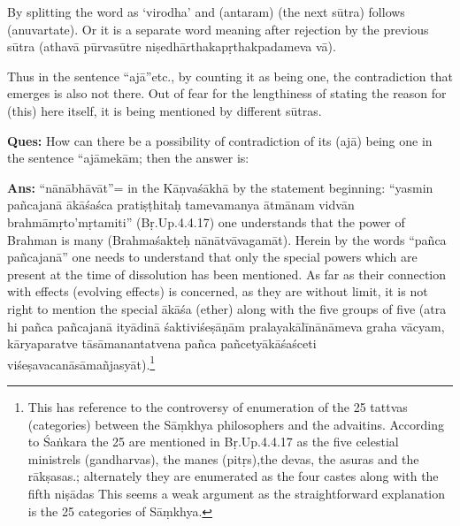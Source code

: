 \textbf{}




By splitting the word as ‘virodha’ and (antaram) (the next sūtra) follows (anuvartate). Or it is a separate word meaning after rejection by the previous sūtra (athavā pūrvasūtre niṣedhārthakapṛthakpadameva vā).

\newpage

Thus in the sentence “ajā”etc., by counting it as being one, the contradiction that emerges is also not there. Out of fear for the lengthiness of stating the reason for (this) here itself, it is being mentioned by different sūtras.  

\textbf{Ques:} How can there be a possibility of contradiction of its (ajā) being one in the sentence “ajāmekām; then the answer is:

\textbf{Ans:} “nānābhāvāt”= in the Kāṇvaśākhā by the statement beginning: “yasmin pañcajanā ākāśaśca pratiṣṭhitaḥ tamevamanya ātmānam vidvān brahmāmṛto’mṛtamiti” (Bṛ.Up.4.4.17) one understands that the power of Brahman is many (Brahmaśakteḥ nānātvāvagamāt). Herein by the words “pañca pañcajanā” one needs to understand that only the special powers which are present at the time of dissolution has been mentioned. As far as their connection with effects (evolving effects) is concerned, as they are without limit, it is not right to mention the special ākāśa (ether) along with the five groups of five (atra hi pañca pañcajanā  ityādinā śaktiviśeṣāṇām pralayakālīnānāmeva graha vācyam, kāryaparatve tāsāmanantatvena pañca pañcetyākāśaśceti viśeṣavacanāsāmañjasyāt).\footnote{This has reference to the controversy of enumeration of the 25 tattvas (categories)  between the Sāṃkhya philosophers and the advaitins. According to Śaṅkara the 25 are mentioned in Bṛ.Up.4.4.17 as the five celestial ministrels (gandharvas), the manes (pitṛs),the devas, the asuras and the rākṣasas.; alternately they are enumerated as the four castes along with the fifth niṣādas This seems a weak argument as the straightforward explanation is the 25 categories of Sāṃkhya.}

